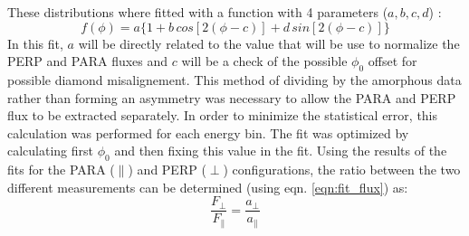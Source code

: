 These distributions where fitted with a function with 4 parameters ($ a,b,c,d $) :
\begin{equation} \label{eqn:fit_flux}
f(\phi) = a \{ 1 + b\, cos[2 (\phi - c) ]  + d\, sin[2(\phi - c)] \} 
\end{equation}
In this fit, $a$ will be directly related to the value that will be use to normalize the PERP and PARA fluxes and $c$ will be a check of the possible $\phi_0$ offset for possible diamond misalignement.
This method of dividing by the amorphous data rather than forming an asymmetry was necessary to allow the PARA and PERP flux to be extracted separately. In order to minimize the statistical error, this calculation was performed for each energy bin. The fit was optimized by calculating first $\phi_0$ and then fixing this value in the fit. 
Using the results of the fits for the PARA ($\parallel$) and PERP ($\perp$) configurations, the ratio between the two different measurements can be determined (using eqn. \ref{eqn:fit_flux}) as:
\begin{equation}
\frac{F_{\perp}}{F_{\parallel}} = \frac{a_{\perp}}{a_{\parallel}}
\end{equation}


